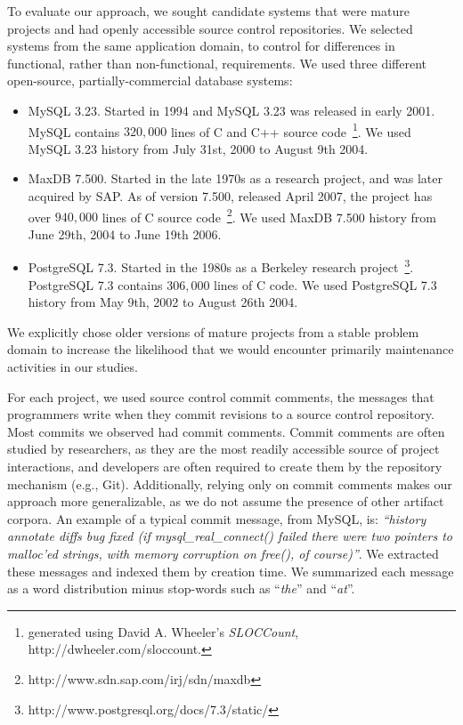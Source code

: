\documentclass[smallextended]{svjour3}       %
\begin{document}
To evaluate our approach, we sought candidate systems that were mature projects and had openly accessible source control repositories. 
We selected systems from the same application domain, to control for differences in functional, rather than non-functional, requirements. 
We used three different open-source, partially-commercial database systems:
\begin{itemize}
\item  MySQL 3.23. Started in 1994 and MySQL 3.23 was released in early 2001. MySQL contains $320,000$ lines of C and C++ source code~\footnote{generated
using David A. Wheeler's \emph{SLOCCount},
{http://dwheeler.com/sloccount}.}. We used MySQL 3.23 history from July
31st, 2000 to August 9th 2004.
\item MaxDB 7.500. Started in the late 1970s as a research project, and was later acquired by SAP. As of version 7.500, released April 2007, the project
has over $940,000$ lines of C source
code~\footnote{{http://www.sdn.sap.com/irj/sdn/maxdb}}. 
 We used MaxDB 7.500 history from June
29th, 2004 to June 19th 2006.
\item PostgreSQL 7.3. Started in the 1980s as a Berkeley research
  project~\footnote{{http://www.postgresql.org/docs/7.3/static/}}. PostgreSQL
  7.3 contains $306,000$ lines of C code.
 We used PostgreSQL 7.3 history from May 9th, 2002 to 
 August 26th 2004.

\end{itemize}
  
We explicitly chose older versions of mature projects from a stable problem domain to increase the likelihood that we would encounter primarily
maintenance activities in our studies.

For each project, we used source control commit comments, the messages
that programmers write when they commit revisions to a source control
repository. 
Most commits we observed had commit comments.
Commit comments are often studied by researchers, as they are the most readily accessible source of project interactions, and developers are often
required to create them by the repository mechanism (e.g., Git).  Additionally, relying only on commit comments makes our approach more generalizable,
as we do not assume the presence of other artifact corpora.
An example of a typical commit message, from MySQL, is: \textit{``history annotate diffs bug fixed (if mysql\-\_real\-\_connect() failed there were
two pointers to malloc'ed strings, with memory corruption on free(), of course)''}. 
We extracted these messages and indexed them by creation time. 
We summarized each message as a word distribution minus stop-words such as ``\emph{the}'' and ``\emph{at}''. 
\end{document}

